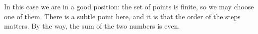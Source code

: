 In this case we are in a good position: the set of points is finite, so we may choose one of them.
There is a subtle point here, and it is that the order of the steps matters.
By the way, the sum of the two numbers is even.